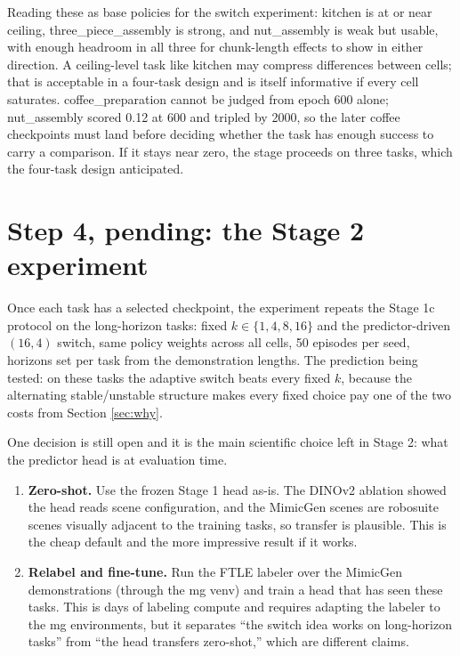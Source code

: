 \documentclass[11pt]{article}
\begin{document}
Reading these as base policies for the switch experiment: kitchen is at or
near ceiling, three\_piece\_assembly is strong, and nut\_assembly is weak but
usable, with enough headroom in all three for chunk-length effects to show in
either direction. A ceiling-level task like kitchen may compress differences
between cells; that is acceptable in a four-task design and is itself
informative if every cell saturates. coffee\_preparation cannot be judged from
epoch 600 alone; nut\_assembly scored 0.12 at 600 and tripled by 2000, so the
later coffee checkpoints must land before deciding whether the task has
enough success to carry a comparison. If it stays near zero, the stage
proceeds on three tasks, which the four-task design anticipated.

\section{Step 4, pending: the Stage 2 experiment}
\label{sec:experiment}

Once each task has a selected checkpoint, the experiment repeats the Stage 1c
protocol on the long-horizon tasks: fixed $k \in \{1, 4, 8, 16\}$ and the
predictor-driven $(16, 4)$ switch, same policy weights across all cells, 50
episodes per seed, horizons set per task from the demonstration lengths. The
prediction being tested: on these tasks the adaptive switch beats every fixed
$k$, because the alternating stable/unstable structure makes every fixed choice
pay one of the two costs from Section \ref{sec:why}.

One decision is still open and it is the main scientific choice left in Stage
2: what the predictor head is at evaluation time.

\begin{enumerate}[leftmargin=2em]
  \item \textbf{Zero-shot.} Use the frozen Stage 1 head as-is. The DINOv2
        ablation showed the head reads scene configuration, and the MimicGen
        scenes are robosuite scenes visually adjacent to the training tasks, so
        transfer is plausible. This is the cheap default and the more
        impressive result if it works.
  \item \textbf{Relabel and fine-tune.} Run the FTLE labeler over the MimicGen
        demonstrations (through the mg venv) and train a head that has seen
        these tasks. This is days of labeling compute and requires adapting the
        labeler to the mg environments, but it separates ``the switch idea
        works on long-horizon tasks'' from ``the head transfers zero-shot,''
        which are different claims.
  \end{enumerate}
\end{document}
